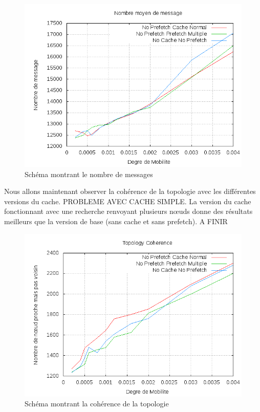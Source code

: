 	\begin{figure}[!h]
        \centering
        \includegraphics[scale=0.5]{../CacheCode/SolipsisPeersim/resultats/Courbes/Courbes_Final_Rapport/Nombre_Messages_Caches.png}
        \caption{Schéma montrant le nombre de messages}
        \label{courbesNbMessCache:config1}
        \end{figure}

Nous allons maintenant observer la cohérence de la topologie avec les différentes versions du cache. PROBLEME AVEC CACHE SIMPLE. La version du cache fonctionnant avec une recherche renvoyant plusieurs nœuds donne des résultats meilleurs que la version de base (sans cache et sans prefetch). A FINIR

	\begin{figure}[!h]
        \centering
        \includegraphics[scale=0.5]{../CacheCode/SolipsisPeersim/resultats/Courbes/Courbes_Final_Rapport/Topology_Coherence_Caches.png}
        \caption{Schéma montrant la cohérence de la topologie}
        \label{courbesTopoCohCache:config1}
        \end{figure}

